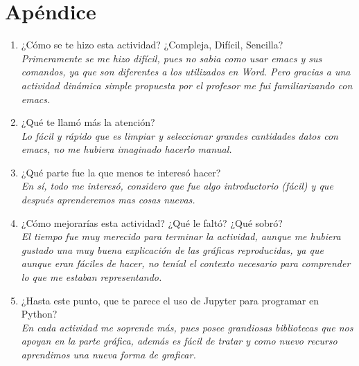 \documentclass[12pt]{article}
\begin{document}
\section*{Apéndice}
\begin{enumerate}
\item ¿Cómo se te hizo esta actividad? ¿Compleja, Difícil, Sencilla?\\
\textit{Primeramente se me hizo difícil, pues no sabia como usar emacs y sus comandos, ya que son diferentes a los utilizados en Word. Pero gracias a una actividad dinámica simple propuesta por el profesor me fui familiarizando con emacs.}

\item ¿Qué te llamó más la atención?\\
\textit{Lo fácil y rápido que es limpiar y seleccionar grandes cantidades datos con emacs, no me hubiera imaginado hacerlo manual.}

\item ¿Qué parte fue la que menos te interesó hacer?\\
\textit{En sí, todo me interesó, considero que fue algo introductorio (fácil) y que después aprenderemos mas cosas nuevas.}

\item ¿Cómo mejorarías esta actividad? ¿Qué le faltó? ¿Qué sobró?\\
\textit{El tiempo fue muy merecido para terminar la actividad, aunque me hubiera gustado una muy buena explicación de las gráficas reproducidas, ya que aunque eran fáciles de hacer, no teníal el contexto necesario para comprender lo que me estaban representando.}

\item ¿Hasta este punto, que te parece el uso de Jupyter para programar en Python? \\
\textit{En cada actividad me soprende más, pues posee grandiosas bibliotecas que nos apoyan en la parte gráfica, además es fácil de tratar y como nuevo recurso aprendimos una nueva forma de graficar.}

\end{enumerate}
\end{document}
